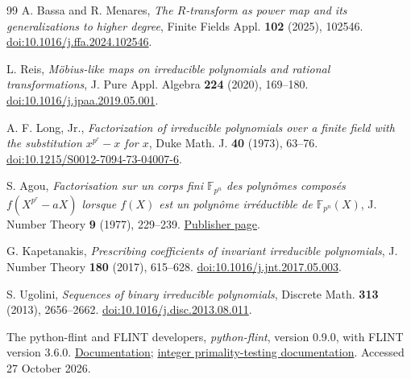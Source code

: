 \documentclass[11pt]{article}
\theoremstyle{definition}
\theoremstyle{remark}
\begin{document}
\begin{thebibliography}{99}
A. Bassa and R. Menares,
\emph{The $R$-transform as power map and its generalizations to higher degree},
Finite Fields Appl. \textbf{102} (2025), 102546.
\href{https://doi.org/10.1016/j.ffa.2024.102546}{doi:10.1016/j.ffa.2024.102546}.

L. Reis,
\emph{M\"obius-like maps on irreducible polynomials and rational transformations},
J. Pure Appl. Algebra \textbf{224} (2020), 169--180.
\href{https://doi.org/10.1016/j.jpaa.2019.05.001}{doi:10.1016/j.jpaa.2019.05.001}.

A. F. Long, Jr.,
\emph{Factorization of irreducible polynomials over a finite field with
the substitution $x^{p^r}-x$ for $x$},
Duke Math. J. \textbf{40} (1973), 63--76.
\href{https://doi.org/10.1215/S0012-7094-73-04007-6}{doi:10.1215/S0012-7094-73-04007-6}.

S. Agou,
\emph{Factorisation sur un corps fini $\mathbb F_{p^n}$ des
polyn\^omes compos\'es $f(X^{p^r}-aX)$ lorsque $f(X)$ est un
polyn\^ome irr\'eductible de $\mathbb F_{p^n}(X)$},
J. Number Theory \textbf{9} (1977), 229--239.
\href{https://www.sciencedirect.com/science/article/pii/0022314X77900270}{Publisher page}.

G. Kapetanakis,
\emph{Prescribing coefficients of invariant irreducible polynomials},
J. Number Theory \textbf{180} (2017), 615--628.
\href{https://doi.org/10.1016/j.jnt.2017.05.003}{doi:10.1016/j.jnt.2017.05.003}.

S. Ugolini,
\emph{Sequences of binary irreducible polynomials},
Discrete Math. \textbf{313} (2013), 2656--2662.
\href{https://doi.org/10.1016/j.disc.2013.08.011}{doi:10.1016/j.disc.2013.08.011}.

The python-flint and FLINT developers,
\emph{python-flint}, version 0.9.0, with FLINT version 3.6.0.
\href{https://python-flint.readthedocs.io/}{Documentation};
\href{https://flintlib.org/doc/fmpz.html}{integer primality-testing documentation}.
Accessed 27 October 2026.

\end{thebibliography}
\end{document}
